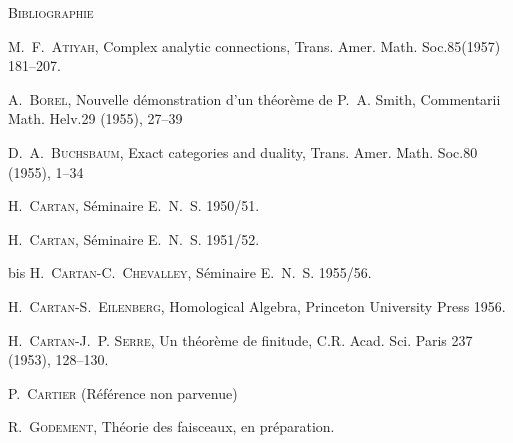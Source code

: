 \clearpage
{}

\begin{center}\normalsize\textsc{Bibliographie}\end{center}

\small
\begin{list}{}{%
  \setlength{\leftmargin}{5.3em}%
  \setlength{\itemindent}{-3em}%
  \setlength{\labelwidth}{1.6em}%
  \setlength{\labelsep}{0.7em}%
  \setlength{\itemsep}{0.28em}%
  \setlength{\parsep}{0pt}%
  \setlength{\topsep}{0.3em}%
}
\item[{[1]}] M.\ F.\ \textsc{Atiyah}, Complex analytic connections,
Trans. Amer. Math. Soc.85(1957) 181--207.

\item[{[2]}] A.\ \textsc{Borel}, Nouvelle démonstration d'un théorème de
P.\ A. Smith, Commentarii Math. Helv.29 (1955), 27--39

\item[{[3]}] D.\ A.\ \textsc{Buchsbaum}, Exact categories and duality,
Trans. Amer. Math. Soc.80 (1955), 1--34

\item[{[4]}] H.\ \textsc{Cartan}, Séminaire E.\ N.\ S. 1950/51.

\item[{[5]}] H.\ \textsc{Cartan}, Séminaire E.\ N.\ S. 1951/52.

\item[{[5]}] bis H.\ \textsc{Cartan-C.\ Chevalley}, Séminaire E.\ N.\ S. 1955/56.

\item[{[6]}] H.\ \textsc{Cartan-S.\ Eilenberg}, Homological Algebra,
Princeton University Press 1956.

\item[{[7]}] H.\ \textsc{Cartan-J.\ P. Serre}, Un théorème de finitude,
C.R. Acad. Sci. Paris 237 (1953), 128--130.

\item[{[8]}] P.\ \textsc{Cartier} (Référence non parvenue)

\item[{[9]}] R.\ \textsc{Godement}, Théorie des faisceaux, en préparation.


\end{list}

